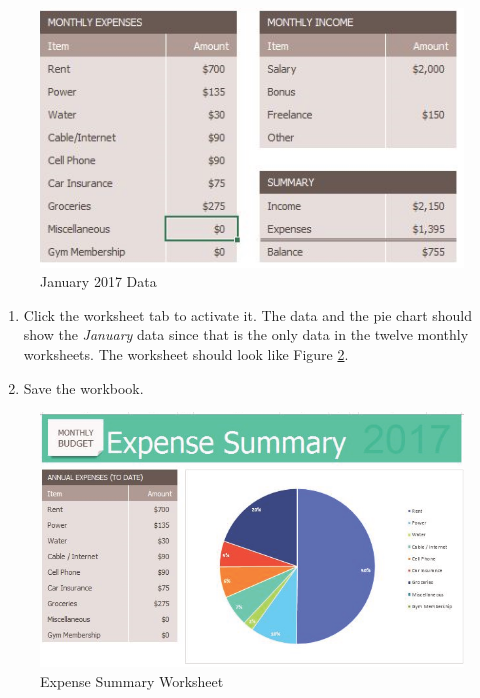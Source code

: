 \begin{figure}[H]
	\centering
	\includegraphics[width=\maxwidth{.95\linewidth}]{gfx/ch06_fig13}
	\caption{January 2017 Data}
	\label{06:fig13}
\end{figure}

\begin{enumerate}[resume]
	\item Click the  worksheet tab to activate it. The data and the pie chart should show the \textit{January} data since that is the only data in the twelve monthly worksheets. The worksheet should look like Figure \ref{06:fig14}.
	\item Save the  workbook.
\end{enumerate}

\begin{figure}[H]
	\centering
	\includegraphics[width=\maxwidth{.95\linewidth}]{gfx/ch06_fig14}
	\caption{Expense Summary Worksheet}
	\label{06:fig14}
\end{figure}

